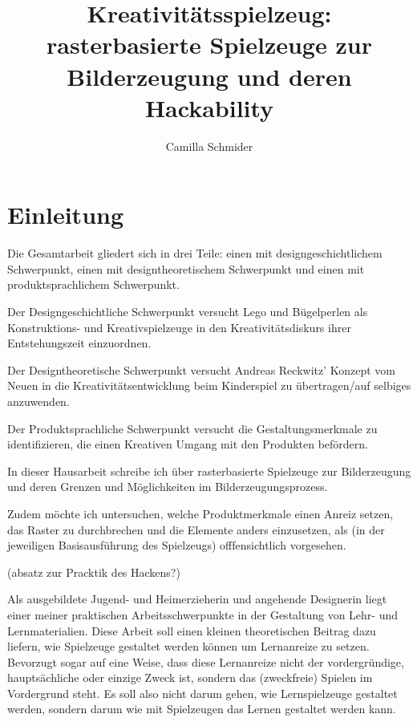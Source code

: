 \documentclass[11pt,a4paper,twoside]{scrreprt}
\title{Kreativitätsspielzeug: rasterbasierte Spielzeuge zur Bilderzeugung und deren Hackability}
\author{Camilla Schmider}
\begin{document}
\maketitle
\tableofcontents

\chapter{Einleitung}


Die Gesamtarbeit gliedert sich in drei Teile: einen mit designgeschichtlichem Schwerpunkt, einen mit designtheoretischem Schwerpunkt und einen mit produktsprachlichem Schwerpunkt. 

Der Designgeschichtliche Schwerpunkt versucht Lego und Bügelperlen als Konstruktions- und Kreativspielzeuge in den Kreativitätsdiskurs ihrer Entstehungszeit einzuordnen.

Der Designtheoretische Schwerpunkt versucht Andreas Reckwitz' Konzept vom Neuen in die Kreativitätsentwicklung beim Kinderspiel zu übertragen/auf selbiges anzuwenden.

Der Produktsprachliche Schwerpunkt versucht die Gestaltungsmerkmale zu identifizieren, die einen Kreativen Umgang mit den Produkten befördern.

\begin{comment}
Für die Einleitung:
-Forschungsgegenstand klar benennen
-Gegenstand einordnen und abgrenzen?
-übergreifende Forschungsfrage(n) für die drei Teile klar formulieren
-Arbeitshypothese(n) formulieren?
-Fachtermini, die über alle Teile hinweg genutzt werden grob anreißen?
\end{comment}

In dieser Hausarbeit schreibe ich über rasterbasierte Spielzeuge zur Bilderzeugung und deren Grenzen und Möglichkeiten im Bilderzeugungsprozess. 

Zudem möchte ich untersuchen, welche Produktmerkmale einen Anreiz setzen, das Raster zu durchbrechen und die Elemente anders einzusetzen, als (in der jeweiligen Basisausführung des Spielzeugs) offfensichtlich vorgesehen.

(absatz zur Pracktik des Hackens?)

Als ausgebildete Jugend- und Heimerzieherin und angehende Designerin liegt einer meiner praktischen Arbeitsschwerpunkte in der Gestaltung von Lehr- und Lernmaterialien. Diese Arbeit soll einen kleinen theoretischen Beitrag dazu liefern, wie Spielzeuge gestaltet werden können um Lernanreize zu setzen. Bevorzugt sogar auf eine Weise, dass diese Lernanreize nicht der vordergründige, hauptsächliche oder einzige Zweck ist, sondern das (zweckfreie) Spielen im Vordergrund steht. Es soll also nicht darum gehen, wie Lernspielzeuge gestaltet werden, sondern darum wie mit Spielzeugen das Lernen gestaltet werden kann. 
\end{document}
